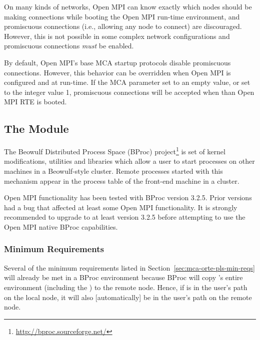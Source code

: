 On many kinds of networks, Open MPI can know exactly which nodes should be
making connections while booting the Open MPI run-time environment, and
promiscuous connections (i.e., allowing any node to connect) are
discouraged.  However, this is not possible in some complex network
configurations and promiscuous connections {\em must} be enabled.
  
By default, Open MPI's base  MCA startup protocols disable
promiscuous connections.  However, this behavior can be overridden
when Open MPI is configured and at run-time.  If the MCA parameter
 set to an empty value, or set to
the integer value 1, promiscuous connections will be accepted when
than Open MPI RTE is booted.


\subsection{The  Module}

The Beowulf Distributed Process Space (BProc)
project\footnote{\url{http://bproc.sourceforge.net/}} is set of kernel
modifications, utilities and libraries which allow a user to start
processes on other machines in a Beowulf-style cluster.  Remote
processes started with this mechanism appear in the process table of
the front-end machine in a cluster.

Open MPI functionality has been tested with BProc version 3.2.5.  Prior
versions had a bug that affected at least some Open MPI functionality.
It is strongly recommended to upgrade to at least version 3.2.5 before
attempting to use the Open MPI native BProc capabilities.


\subsubsection{Minimum Requirements}

Several of the minimum requirements listed in
Section~\ref{sec:mca-orte-pls-min-reqs} will already be met in a BProc
environment because BProc will copy 's entire environment
(including the ) to the remote node.  Hence, if
 is in the user's path on the local node, it will also
[automatically] be in the user's path on the remote node.

